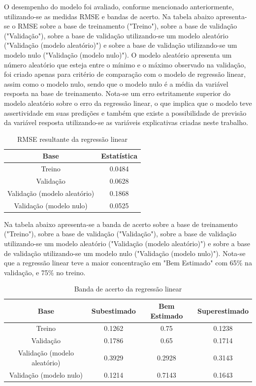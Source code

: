 O desempenho do modelo foi avaliado, conforme mencionado anteriormente, utilizando-se as medidas RMSE e bandas de acerto. Na tabela abaixo apresenta-se o RMSE sobre a base de treinamento ("Treino"), sobre a base de validação ("Validação"), sobre a base de validação utilizando-se um modelo aleatório ("Validação (modelo aleatório)") e sobre a base de validação utilizando-se um modelo nulo ("Validação (modelo nulo)"). O modelo aleatório apresenta um número aleatório que esteja entre o mínimo e o máximo observado na validação, foi criado apenas para critério de comparação com o modelo de regressão linear, assim como o modelo nulo, sendo que o modelo nulo é a média da variável resposta na base de treinamento. Nota-se um erro estritamente superior do modelo aleatório sobre o erro da regressão linear, o que implica que o modelo teve assertividade em suas predições e também que existe a possibilidade de previsão da variável resposta utilizando-se as variáveis explicativas criadas neste trabalho.

\begin{table}[h]
\centering
\caption{RMSE resultante da regressão linear}
\label{tab:cap3_rmse_reg_lin}
\begin{tabular}{cc}
Base & Estatística \\
\hline
Treino & 0.0484 \\
Validação & 0.0628 \\
Validação (modelo aleatório) & 0.1868 \\
Validação (modelo nulo) & 0.0525 \\
\hline
\end{tabular}
\end{table}
\FloatBarrier

Na tabela abaixo apresenta-se a banda de acerto sobre a base de treinamento ("Treino"), sobre a base de validação ("Validação"), sobre a base de validação utilizando-se um modelo aleatório ("Validação (modelo aleatório)") e sobre a base de validação utilizando-se um modelo nulo ("Validação (modelo nulo)"). Nota-se que a regressão linear teve a maior concentração em "Bem Estimado" com 65\% na validação, e 75\% no treino.

\begin{table}[h]
\centering
\caption{Banda de acerto da regressão linear}
\label{tab:cap3_band_reg_lin}
\begin{tabular}{cccc}
Base & Subestimado & Bem Estimado & Superestimado \\
\hline
Treino & 0.1262 & 0.75 & 0.1238 \\
Validação & 0.1786 & 0.65 & 0.1714 \\
Validação (modelo aleatório) & 0.3929 & 0.2928 & 0.3143 \\
Validação (modelo nulo) & 0.1214 & 0.7143 & 0.1643 \\
\hline
\end{tabular}
\end{table}
\FloatBarrier

